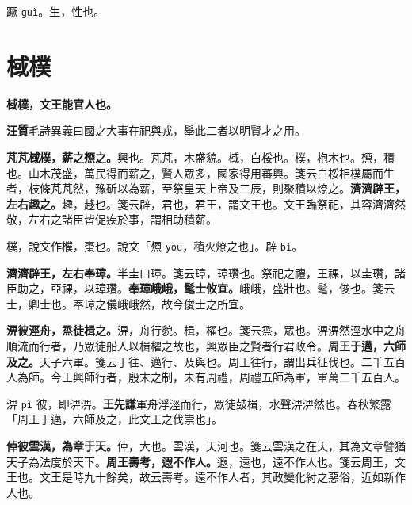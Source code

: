 \begin{quoting}蹶 \texttt{guì}。生，性也。\end{quoting}

\section{棫樸}


\textbf{棫樸，文王能官人也。}

\begin{quoting}\textbf{汪質}毛詩異義曰國之大事在祀與戎，舉此二者以明賢才之用。\end{quoting}

\textbf{芃芃棫樸，薪之槱之。}{\footnotesize 興也。芃芃，木盛貌。棫，白桵也。樸，枹木也。槱，積也。山木茂盛，萬民得而薪之，賢人眾多，國家得用蕃興。箋云白桵相樸屬而生者，枝條芃芃然，豫斫以為薪，至祭皇天上帝及三辰，則聚積以燎之。}\textbf{濟濟辟王，左右趣之。}{\footnotesize 趣，趍也。箋云辟，君也，君王，謂文王也。文王臨祭祀，其容濟濟然敬，左右之諸臣皆促疾於事，謂相助積薪。}

\begin{quoting}樸，說文作㯷，棗也。說文「槱 \texttt{yóu}，積火燎之也」。辟 \texttt{bì}。\end{quoting}

\textbf{濟濟辟王，左右奉璋。}{\footnotesize 半圭曰璋。箋云璋，璋瓚也。祭祀之禮，王祼，以圭瓚，諸臣助之，亞祼，以璋瓚。}\textbf{奉璋峨峨，髦士攸宜。}{\footnotesize 峨峨，盛壯也。髦，俊也。箋云士，卿士也。奉璋之儀峨峨然，故今俊士之所宜。}

\textbf{淠彼涇舟，烝徒楫之。}{\footnotesize 淠，舟行貌。楫，櫂也。箋云烝，眾也。淠淠然涇水中之舟順流而行者，乃眾徒船人以楫櫂之故也，興眾臣之賢者行君政令。}\textbf{周王于邁，六師及之。}{\footnotesize 天子六軍。箋云于往、邁行、及與也。周王往行，謂出兵征伐也。二千五百人為師。今王興師行者，殷末之制，未有周禮，周禮五師為軍，軍萬二千五百人。}

\begin{quoting}淠 \texttt{pì} 彼，即淠淠。\textbf{王先謙}軍舟浮涇而行，眾徒鼓楫，水聲淠淠然也。春秋繁露「周王于邁，六師及之，此文王之伐崇也」。\end{quoting}

\textbf{倬彼雲漢，為章于天。}{\footnotesize 倬，大也。雲漢，天河也。箋云雲漢之在天，其為文章譬猶天子為法度於天下。}\textbf{周王壽考，遐不作人。}{\footnotesize 遐，遠也，遠不作人也。箋云周王，文王也。文王是時九十餘矣，故云壽考。遠不作人者，其政變化紂之惡俗，近如新作人也。}

